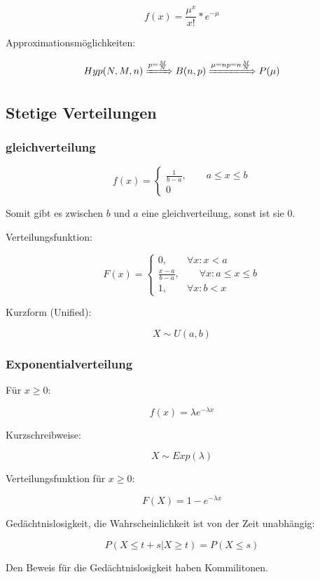 \documentclass[a4paper]{article}
\begin{document}
\[
f(x) = \frac{\mu^x}{x!} * e^{-\mu}
\]

Approximationsmöglichkeiten:

\[
Hyp(N, M, n) \xRightarrow{p=\frac{M}{N}} B(n, p) \xRightarrow{\mu = np = n\frac{M}{N}} P(\mu)
\]

\subsection{Stetige Verteilungen}

\subsubsection*{gleichverteilung}

\[
f(x) = \begin{cases}
    \frac{1}{b-a}, \qquad a \leq x \leq b\\
    0
\end{cases}
\]

Somit gibt es zwischen $b$ und $a$ eine gleichverteilung, sonst ist sie 0.

Verteilungsfunktion:

\[
F(x) = \begin{cases}
    0, \qquad \forall x: x < a\\
    \frac{x-a}{b-a}, \qquad \forall x: a\leq x \leq b\\
    1, \qquad \forall x: b < x
\end{cases}
\]

Kurzform (Unified):

\[
X \sim U(a, b)
\]

\subsubsection*{Exponentialverteilung}


Für $x \geq 0$:

\[
f(x) = \lambda e^{-\lambda x}
\]

Kurzschreibweise:

\[
X \sim Exp(\lambda)
\]

Verteilungsfunktion für $x \geq 0$:

\[
F(X) = 1-e^{-\lambda x}
\]

Gedächtnislosigkeit, die Wahrscheinlichkeit ist von der Zeit unabhängig:

\[
P(X \leq t + s | X \geq t) = P(X \leq s)
\]

Den Beweis für die Gedächtnislosigkeit haben Kommilitonen.
\end{document}
